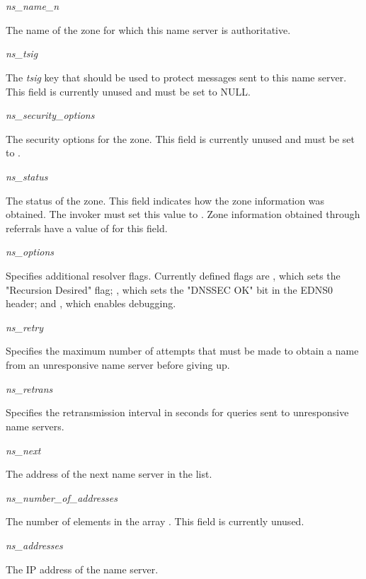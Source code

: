 \begin{description}

\item {\it ns\_name\_n}\verb" "

The name of the zone for which this name server is authoritative.  

\item {\it ns\_tsig}\verb" "

The {\it tsig} key that should be used to protect messages sent to this name
server.  This field is currently unused and must be set to NULL.

\item {\it ns\_security\_options}\verb" "

The security options for the zone.  This field is currently unused and must be
set to .

\item {\it ns\_status}\verb" "

The status of the zone.  This field indicates how the zone information was
obtained.  The invoker must set this value to .
Zone information obtained through referrals have a value of
 for this field.

\item {\it ns\_options}\verb" "

Specifies additional resolver flags.  Currently defined flags are
, which sets the "Recursion Desired" flag;
, which sets the "DNSSEC OK" bit in the EDNS0 header;
and , which enables debugging.

\item {\it ns\_retry}\verb" "

Specifies the maximum number of attempts that must be made to obtain a name
from an unresponsive name server before giving up.

\item {\it ns\_retrans}\verb" "

Specifies the retransmission interval in seconds for queries sent to
unresponsive name servers.

\item {\it ns\_next}\verb" "

The address of the next name server in the list.

\item {\it ns\_number\_of\_addresses}\verb" "

The number of elements in the array .  This field is
currently unused.

\item {\it ns\_addresses}\verb" "

The IP address of the name server.  

\end{description}


